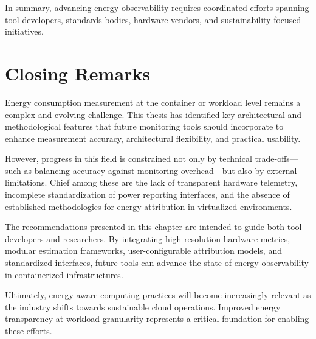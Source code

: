 In summary, advancing energy observability requires coordinated efforts spanning tool developers, standards bodies, hardware vendors, and sustainability-focused initiatives.

\section{Closing Remarks}
\label{sec:future-conclusion}

Energy consumption measurement at the container or workload level remains a complex and evolving challenge. This thesis has identified key architectural and methodological features that future monitoring tools should incorporate to enhance measurement accuracy, architectural flexibility, and practical usability.

However, progress in this field is constrained not only by technical trade-offs---such as balancing accuracy against monitoring overhead---but also by external limitations. Chief among these are the lack of transparent hardware telemetry, incomplete standardization of power reporting interfaces, and the absence of established methodologies for energy attribution in virtualized environments.

The recommendations presented in this chapter are intended to guide both tool developers and researchers. By integrating high-resolution hardware metrics, modular estimation frameworks, user-configurable attribution models, and standardized interfaces, future tools can advance the state of energy observability in containerized infrastructures.

Ultimately, energy-aware computing practices will become increasingly relevant as the industry shifts towards sustainable cloud operations. Improved energy transparency at workload granularity represents a critical foundation for enabling these efforts.




